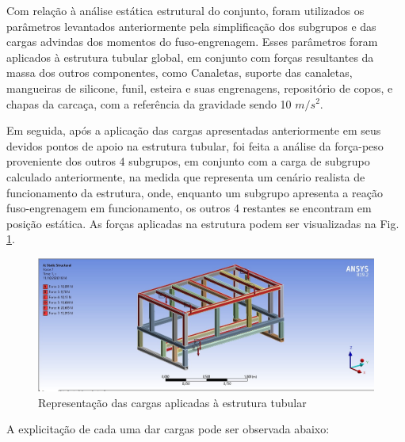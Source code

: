Com relação à análise estática estrutural do conjunto, foram utilizados os parâmetros levantados anteriormente pela simplificação dos subgrupos e das cargas advindas dos momentos do fuso-engrenagem. Esses parâmetros foram aplicados à estrutura tubular global, em conjunto com forças resultantes da massa dos outros componentes, como Canaletas, suporte das canaletas, mangueiras de silicone, funil, esteira e suas engrenagens, repositório de copos, e chapas da carcaça, com a referência da gravidade sendo 10 $m/s^2$. 

Em seguida, após a aplicação das cargas apresentadas anteriormente em seus devidos pontos de apoio na estrutura tubular, foi feita a análise da força-peso proveniente dos outros 4 subgrupos, em conjunto com a carga de subgrupo calculado anteriormente, na medida que representa um cenário realista de funcionamento da estrutura, onde, enquanto um subgrupo apresenta a reação fuso-engrenagem em funcionamento, os outros 4 restantes se encontram em posição estática. As forças aplicadas na estrutura podem ser visualizadas na Fig. \ref{fig:carga_estruturatubular}.

\begin{figure}[H]
    \centering
    \includegraphics[width=1\textwidth]{figuras/estrutura/AnaliseEstaticaTubular/Cargas_Estrutura.jpg}
    \caption{Representação das cargas aplicadas à estrutura tubular }
    \label{fig:carga_estruturatubular}
\end{figure}

A explicitação de cada uma dar cargas pode ser observada abaixo:


